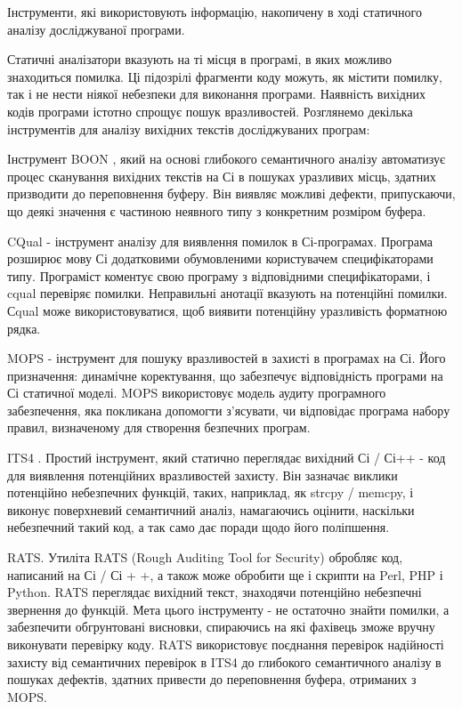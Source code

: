 Інструменти, які використовують інформацію, накопичену в ході статичного аналізу досліджуваної програми.

Статичні аналізатори вказують на ті місця в програмі, в яких можливо знаходиться помилка. Ці підозрілі фрагменти коду можуть, як містити помилку, так і не нести ніякої небезпеки для виконання програми. Наявність вихідних кодів програми істотно спрощує пошук вразливостей.
Розглянемо декілька інструментів для аналізу вихідних текстів досліджуваних програм:

Інструмент BOON , який на основі глибокого семантичного аналізу автоматизує процес сканування вихідних текстів на Сі в пошуках уразливих місць, здатних призводити до переповнення буферу. Він виявляє можливі дефекти, припускаючи, що деякі значення є частиною неявного типу з конкретним розміром буфера.

CQual - інструмент аналізу для виявлення помилок в Сі-програмах. Програма розширює мову Сі додатковими обумовленими користувачем специфікаторами типу. Програміст коментує свою програму з відповідними специфікаторами, і cqual перевіряє помилки. Неправильні анотації вказують на потенційні помилки. Сqual може використовуватися, щоб виявити потенційну уразливість форматною рядка.

MOPS - інструмент для пошуку вразливостей в захисті в програмах на Сі. Його призначення: динамічне коректування, що забезпечує відповідність програми на Сі статичної моделі. MOPS використовує модель аудиту програмного забезпечення, яка покликана допомогти з'ясувати, чи відповідає програма набору правил, визначеному для створення безпечних програм.

ITS4 . Простий інструмент, який статично переглядає вихідний Сі / Сі++ - код для виявлення потенційних вразливостей захисту. Він зазначає виклики потенційно небезпечних функцій, таких, наприклад, як strcpy / memcpy, і виконує поверхневий семантичний аналіз, намагаючись оцінити, наскільки небезпечний такий код, а так само дає поради щодо його поліпшення.

RATS. Утиліта RATS (Rough Auditing Tool for Security) обробляє код, написаний на Сі / Сі + +, а також може обробити ще і скрипти на Perl, PHP і Python. RATS переглядає вихідний текст, знаходячи потенційно небезпечні звернення до функцій. Мета цього інструменту - не остаточно знайти помилки, а забезпечити обгрунтовані висновки, спираючись на які фахівець зможе вручну виконувати перевірку коду. RATS використовує поєднання перевірок надійності захисту від семантичних перевірок в ITS4 до глибокого семантичного аналізу в пошуках дефектів, здатних привести до переповнення буфера, отриманих з MOPS.

